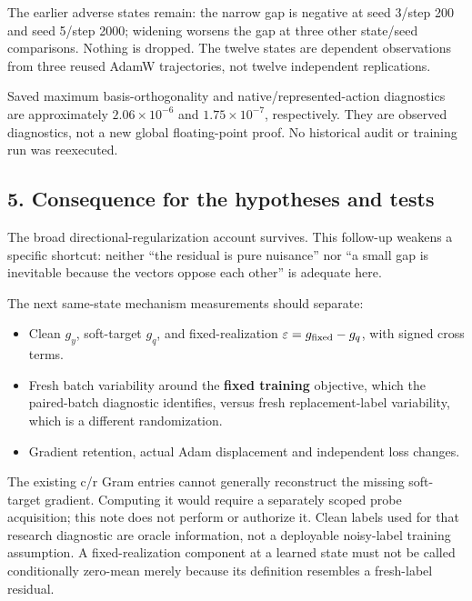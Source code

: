 \documentclass[
  british,
  10pt,
  a4paper,
]{article}
\providecommand{\tightlist}{%
  \setlength{\itemsep}{0pt}\setlength{\parskip}{0pt}}
\begin{document}
The earlier adverse states remain: the narrow gap is negative at seed
3/step 200 and seed 5/step 2000; widening worsens the gap at three other
state/seed comparisons.\allowbreak{} Nothing is dropped. The twelve
states are dependent observations from three reused AdamW
trajectories\allowbreak{},\allowbreak{} not twelve independent
replications\allowbreak{}.\allowbreak{}

Saved maximum basis-\allowbreak{}orthogonalit\allowbreak{}y and
native/\allowbreak{}represented-\allowbreak{}action diagnostics are
approximately \(2.06\times10^{-6}\) and \(1.75\times10^{-7}\),
respectively\allowbreak{}.\allowbreak{} They are observed
diagnostics,\allowbreak{} not a new global floating-\allowbreak{}point
proof. No historical audit or training run was reexecuted.\allowbreak{}

\subsection{5. Consequence for the hypotheses and
tests}\label{label-noise--consequence-for-the-hypotheses-and-tests}

The broad directional-\allowbreak{}regularizati\allowbreak{}on account
survives. This follow-up weakens a specific shortcut: neither ``the
residual is pure nuisance'' nor ``a small gap is inevitable because the
vectors oppose each other'' is adequate here.

The next same-state mechanism measurements should separate:

\begin{itemize}
\tightlist
\item
  Clean \(g_y\), soft-\allowbreak{}target \(g_q\), and
  fixed-\allowbreak{}realization \(\varepsilon=g_{\rm fixed}-g_q\), with
  signed cross terms.
\item
  Fresh batch variability around the \textbf{fixed training} objective,
  which the paired-\allowbreak{}batch diagnostic
  identifies,\allowbreak{} versus fresh replacement-\allowbreak{}label
  variability,\allowbreak{} which is a different
  randomizatio\allowbreak{}n.\allowbreak{}
\item
  Gradient retention, actual Adam displacement and independent loss
  changes.
\end{itemize}

The existing c/r Gram entries cannot generally reconstruct the missing
soft-\allowbreak{}target gradient. Computing it would require a
separately scoped probe acquisition; this note does not perform or
authorize it. Clean labels used for that research diagnostic are oracle
information,\allowbreak{} not a deployable noisy-\allowbreak{}label
training assumption.\allowbreak{} A fixed-\allowbreak{}realization
component at a learned state must not be called conditionally zero-mean
merely because its definition resembles a fresh-\allowbreak{}label
residual.
\end{document}
